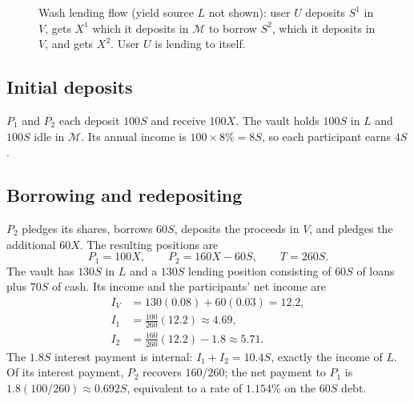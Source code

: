 \documentclass[12pt,oneside]{article}
\begin{document}
\begin{figure}[htbp]
 \centering
 \caption{Wash lending flow (yield source $L$ not shown):
 user $U$ deposits $S^1$ in $V$, gets $X^1$ which it deposits in $\mathcal M$ to borrow $S^2$, which 
 it deposits in $V$, and gets $X^2$. User $U$ is lending to itself.}
 \label{fig:flows}
\end{figure}

\subsection{Initial deposits}
$P_1$ and $P_2$ each deposit $100S$ and receive $100X$. The vault holds
$100S$ in $L$ and $100S$ idle in $\mathcal M$. Its annual income is
$100\times8\%=8S$, so each participant earns $4S$.

\subsection{Borrowing and redepositing}
$P_2$ pledges its shares, borrows $60S$, deposits the proceeds in $V$,
and pledges the additional $60X$. The resulting positions are
\[
 P_1=100X,\qquad P_2=160X-60S,\qquad T=260S.
\]
The vault has $130S$ in $L$ and a $130S$ lending position consisting
of $60S$ of loans plus $70S$ of cash. Its income and the participants'
net income are
\begin{align*}
 I_V &=130(0.08)+60(0.03)=12.2,\\
 I_1 &=\frac{100}{260}(12.2)\approx4.69,\\
 I_2 &=\frac{160}{260}(12.2)-1.8\approx5.71.
\end{align*}
The $1.8S$ interest payment is internal: $I_1+I_2=10.4S$, exactly
the income of $L$. Of its interest payment, $P_2$ recovers $160/260$;
the net payment to $P_1$ is $1.8(100/260)\approx0.692S$, equivalent
to a rate of $1.154\%$ on the $60S$ debt.
\end{document}
